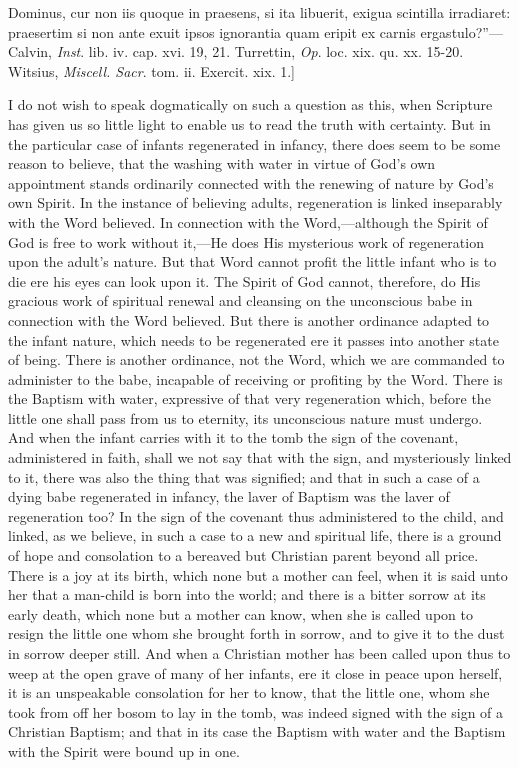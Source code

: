 \documentclass[]{book}
\begin{document}
{Dominus, cur non iis quoque in praesens, si ita libuerit, exigua scintilla irradiaret: praesertim si non ante exuit ipsos ignorantia quam eripit ex carnis ergastulo?''---Calvin, \emph{Inst}. lib. iv. cap. xvi. 19, 21. Turrettin, \emph{Op}. loc. xix. qu. xx. 15-20. Witsius, \emph{Miscell. Sacr}. tom. ii. Exercit. xix. 1.{]}}

I do not wish to speak dogmatically on such a question as this, when Scripture has given us so little light to enable us to read the truth with certainty. But in the particular case of infants regenerated in infancy, there does seem to be some reason to believe, that the washing with water in virtue of God's own appointment stands ordinarily connected with the renewing of nature by God's own Spirit. In the instance of believing adults, regeneration is linked inseparably with the Word believed. In connection with the Word,---although the Spirit of God is free to work without it,---He does His mysterious work of regeneration upon the adult's nature. But that Word cannot profit the little infant who is to die ere his eyes can look upon it. The Spirit of God cannot, therefore, do His gracious work of spiritual renewal and cleansing on the unconscious babe in connection with the Word believed. But there is another ordinance adapted to the infant nature, which needs to be regenerated ere it passes into another state of being. There is another ordinance, not the Word, which we are commanded to administer to the babe, incapable of receiving or profiting by the Word. There is the Baptism with water, expressive of that very regeneration which, before the little one shall pass from us to eternity, its unconscious nature must undergo. And when the infant carries with it to the tomb the sign of the covenant, administered in faith, shall we not say that with the sign, and mysteriously linked to it, there was also the thing that was signified; and that in such a case of a dying babe regenerated in infancy, the laver of Baptism was the laver of regeneration too? In the sign of the covenant thus administered to the child, and linked, as we believe, in such a case to a new and spiritual life, there is a ground of hope and consolation to a bereaved but Christian parent beyond all price. There is a joy at its birth, which none but a mother can feel, when it is said unto her that a man-child is born into the world; and there is a bitter sorrow at its early death, which none but a mother can know, when she is called upon to resign the little one whom she brought forth in sorrow, and to give it to the dust in sorrow deeper still. And when a Christian mother has been called upon thus to weep at the open grave of many of her infants, ere it close in peace upon herself, it is an unspeakable consolation for her to know, that the little one, whom she took from off her bosom to lay in the tomb, was indeed signed with the sign of a Christian Baptism; and that in its case the Baptism with water and the Baptism with the Spirit were bound up in one.
\end{document}
